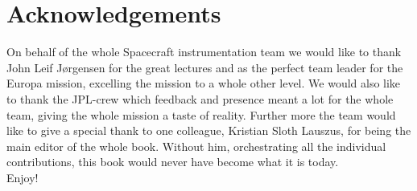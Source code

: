 \chapter{Acknowledgements}
On behalf of the whole Spacecraft instrumentation team we would like to thank John Leif Jørgensen for the great lectures and as the perfect team leader for the Europa mission, excelling the mission to a whole other level. We would also like to thank the JPL-crew which feedback and presence meant a lot for the whole team, giving the whole mission a taste of reality.
Further more the team would like to give a special thank to one colleague, Kristian Sloth Lauszus, for being the main editor of the whole book. Without him, orchestrating all the individual contributions, this book would never have become what it is today.\\

\noindent
Enjoy!
